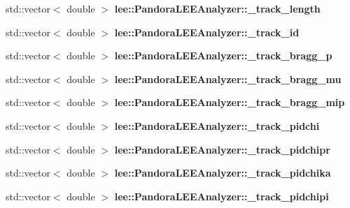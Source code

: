 \begin{DoxyCompactItemize}
\item 
\hypertarget{group__lee_ga801ed095fb9dfb752f424ea91107cffc}{std\-::vector$<$ double $>$ {\bfseries lee\-::\-Pandora\-L\-E\-E\-Analyzer\-::\-\_\-track\-\_\-length}}\label{group__lee_ga801ed095fb9dfb752f424ea91107cffc}

\item 
\hypertarget{group__lee_ga13a633d3b83e96b70adae044df973ec7}{std\-::vector$<$ double $>$ {\bfseries lee\-::\-Pandora\-L\-E\-E\-Analyzer\-::\-\_\-track\-\_\-id}}\label{group__lee_ga13a633d3b83e96b70adae044df973ec7}

\item 
\hypertarget{group__lee_ga4297d696c8a18a62866df4ae2af0115f}{std\-::vector$<$ double $>$ {\bfseries lee\-::\-Pandora\-L\-E\-E\-Analyzer\-::\-\_\-track\-\_\-bragg\-\_\-p}}\label{group__lee_ga4297d696c8a18a62866df4ae2af0115f}

\item 
\hypertarget{group__lee_ga26c2928e27efaef45a0bd73265732f61}{std\-::vector$<$ double $>$ {\bfseries lee\-::\-Pandora\-L\-E\-E\-Analyzer\-::\-\_\-track\-\_\-bragg\-\_\-mu}}\label{group__lee_ga26c2928e27efaef45a0bd73265732f61}

\item 
\hypertarget{group__lee_ga54899eb2a96c6b30e3aa350877ee396f}{std\-::vector$<$ double $>$ {\bfseries lee\-::\-Pandora\-L\-E\-E\-Analyzer\-::\-\_\-track\-\_\-bragg\-\_\-mip}}\label{group__lee_ga54899eb2a96c6b30e3aa350877ee396f}

\item 
\hypertarget{group__lee_gad41a5c8f9908d57ca71dafdd1acffa77}{std\-::vector$<$ double $>$ {\bfseries lee\-::\-Pandora\-L\-E\-E\-Analyzer\-::\-\_\-track\-\_\-pidchi}}\label{group__lee_gad41a5c8f9908d57ca71dafdd1acffa77}

\item 
\hypertarget{group__lee_gaecf90a4b535a1eea4a2e46efaed73aee}{std\-::vector$<$ double $>$ {\bfseries lee\-::\-Pandora\-L\-E\-E\-Analyzer\-::\-\_\-track\-\_\-pidchipr}}\label{group__lee_gaecf90a4b535a1eea4a2e46efaed73aee}

\item 
\hypertarget{group__lee_gacd3a6086b23d0242a02a1aaafaa22f21}{std\-::vector$<$ double $>$ {\bfseries lee\-::\-Pandora\-L\-E\-E\-Analyzer\-::\-\_\-track\-\_\-pidchika}}\label{group__lee_gacd3a6086b23d0242a02a1aaafaa22f21}

\item 
\hypertarget{group__lee_gaecc3128a6d2e1ce777b2a47cf8d8592e}{std\-::vector$<$ double $>$ {\bfseries lee\-::\-Pandora\-L\-E\-E\-Analyzer\-::\-\_\-track\-\_\-pidchipi}}\label{group__lee_gaecc3128a6d2e1ce777b2a47cf8d8592e}


\end{DoxyCompactItemize}
